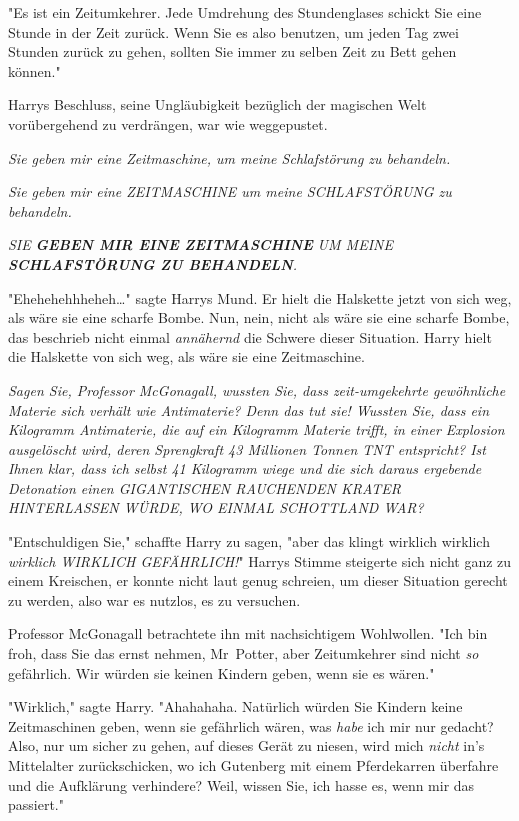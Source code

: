{"Es ist ein Zeitumkehrer. Jede Umdrehung des Stundenglases schickt Sie eine Stunde in der Zeit zurück. Wenn Sie es also benutzen, um jeden Tag zwei Stunden zurück zu gehen, sollten Sie immer zu selben Zeit zu Bett gehen können."

Harrys Beschluss, seine Ungläubigkeit bezüglich der magischen Welt vorübergehend zu verdrängen, war wie weggepustet.

\emph{Sie geben mir eine Zeitmaschine, um meine Schlafstörung zu behandeln.}

\emph{Sie geben mir eine ZEITMASCHINE um meine SCHLAFSTÖRUNG zu behandeln.}

\emph{SIE} \emph{\textbf{\emph{GEBEN MIR EINE ZEITMASCHINE}}} \emph{UM MEINE} \emph{\textbf{\emph{SCHLAFSTÖRUNG ZU BEHANDELN}}.}

"Ehehehehhheheh…" sagte Harrys Mund. Er hielt die Halskette jetzt von sich weg, als wäre sie eine scharfe Bombe. Nun, nein, nicht als wäre sie eine scharfe Bombe, das beschrieb nicht einmal \emph{annähernd} die Schwere dieser Situation. Harry hielt die Halskette von sich weg, als wäre sie eine Zeitmaschine.

\emph{Sagen Sie, Professor McGonagall, wussten Sie, dass zeit-umgekehrte gewöhnliche Materie sich verhält wie Antimaterie? Denn das tut sie! Wussten Sie, dass ein Kilogramm Antimaterie, die auf ein Kilogramm Materie trifft, in einer Explosion ausgelöscht wird, deren Sprengkraft 43 Millionen Tonnen TNT entspricht? Ist Ihnen klar, dass ich selbst 41 Kilogramm wiege und die sich daraus ergebende Detonation einen GIGANTISCHEN RAUCHENDEN KRATER HINTERLASSEN WÜRDE, WO EINMAL SCHOTTLAND WAR?}

"Entschuldigen Sie," schaffte Harry zu sagen, "aber das klingt wirklich wirklich \emph{wirklich WIRKLICH GEFÄHRLICH!}" Harrys Stimme steigerte sich nicht ganz zu einem Kreischen, er konnte nicht laut genug schreien, um dieser Situation gerecht zu werden, also war es nutzlos, es zu versuchen.

Professor McGonagall betrachtete ihn mit nachsichtigem Wohlwollen. "Ich bin froh, dass Sie das ernst nehmen, Mr~Potter, aber Zeitumkehrer sind nicht \emph{so} gefährlich. Wir würden sie keinen Kindern geben, wenn sie es wären."

"Wirklich," sagte Harry. "Ahahahaha. Natürlich würden Sie Kindern keine Zeitmaschinen geben, wenn sie gefährlich wären, was \emph{habe} ich mir nur gedacht? Also, nur um sicher zu gehen, auf dieses Gerät zu niesen, wird mich \emph{nicht} in's Mittelalter zurückschicken, wo ich Gutenberg mit einem Pferdekarren überfahre und die Aufklärung verhindere? Weil, wissen Sie, ich hasse es, wenn mir das passiert."

}
